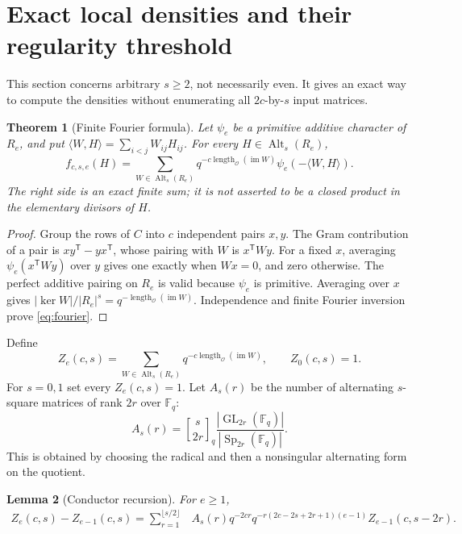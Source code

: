 \documentclass[11pt]{article}
\newtheorem{theorem}{Theorem}[section]
\newtheorem{lemma}[theorem]{Lemma}
\theoremstyle{remark}
\newcommand{\OO}{\mathcal O}
\newcommand{\FF}{\mathbb F}
\newcommand{\Alt}{\operatorname{Alt}}
\newcommand{\Sp}{\operatorname{Sp}}
\newcommand{\GL}{\operatorname{GL}}
\newcommand{\im}{\operatorname{im}}
\newcommand{\length}{\operatorname{length}}
\newcommand{\trans}{\mathsf T}
\newcommand{\qbin}[2]{\genfrac{[}{]}{0pt}{}{#1}{#2}_q}
\begin{document}
\section{Exact local densities and their regularity threshold}

This section concerns arbitrary \(s\ge2\), not necessarily even.
It gives an exact way to compute the densities without enumerating all
\(2c\)-by-\(s\) input matrices.

\begin{theorem}[Finite Fourier formula]\label{thm:fourier}
Let \(\psi_e\) be a primitive additive character of \(R_e\), and put
\(\langle W,H\rangle=\sum_{i<j}W_{ij}H_{ij}\).
For every \(H\in\Alt_s(R_e)\),
\[
 f_{c,s,e}(H)=
 \sum_{W\in\Alt_s(R_e)}
 q^{-c\length_\OO(\im W)}
 \psi_e(-\langle W,H\rangle).
 \tag{5.1}\label{eq:fourier}
\]
The right side is an exact finite sum; it is not asserted to be a
closed product in the elementary divisors of \(H\).
\end{theorem}

\begin{proof}
Group the rows of \(C\) into \(c\) independent pairs \(x,y\).
The Gram contribution of a pair is \(xy^\trans-yx^\trans\), whose
pairing with \(W\) is \(x^\trans Wy\).
For a fixed \(x\), averaging \(\psi_e(x^\trans Wy)\) over \(y\)
gives one exactly when \(Wx=0\), and zero otherwise.
The perfect additive pairing on \(R_e\) is valid because \(\psi_e\)
is primitive. Averaging over \(x\) gives
\(|\ker W|/|R_e|^s=q^{-\length_\OO(\im W)}\).
Independence and finite Fourier inversion prove \eqref{eq:fourier}.
\end{proof}

Define
\[
 Z_e(c,s)=\sum_{W\in\Alt_s(R_e)}q^{-c\length_\OO(\im W)},
 \qquad Z_0(c,s)=1.
\]
For \(s=0,1\) set every \(Z_e(c,s)=1\).
Let \(A_s(r)\) be the number of alternating \(s\)-square matrices
of rank \(2r\) over \(\FF_q\):
\[
 A_s(r)=\qbin{s}{2r}\frac{|\GL_{2r}(\FF_q)|}{|\Sp_{2r}(\FF_q)|}.
 \tag{5.2}\label{eq:Ar}
\]
This is obtained by choosing the radical and then a nonsingular
alternating form on the quotient.

\begin{lemma}[Conductor recursion]\label{lem:recursion}
For \(e\ge1\),
\begin{align}
 Z_e(c,s)-Z_{e-1}(c,s)
  =\sum_{r=1}^{\lfloor s/2\rfloor}
  &A_s(r)q^{-2cr}
    q^{-r(2c-2s+2r+1)(e-1)}
    Z_{e-1}(c,s-2r).
 \tag{5.3}\label{eq:recursion}
\end{align}
\end{lemma}
\end{document}
